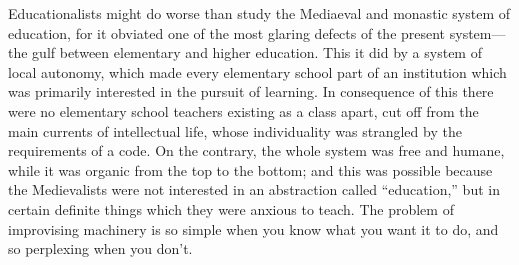 \documentclass{book}
\begin{document}
Educationalists might do worse than study the Mediaeval and monastic system of education, for it obviated one of the most glaring defects of the present system—the gulf between elementary and higher education. This it did by a system of local autonomy, which made every elementary school part of an institution which was primarily interested in the pursuit of learning. In consequence of this there were no elementary school teachers existing as a class apart, cut off from the main currents of intellectual life, whose individuality was strangled by the requirements of a code. On the contrary, the whole system was free and humane, while it was organic from the top to the bottom; and this was possible because the Medievalists were not interested in an abstraction called “education,” but in certain definite things which they were anxious to teach. The problem of improvising machinery is so simple when you know what you want it to do, and so perplexing when you don’t.
\end{document}

